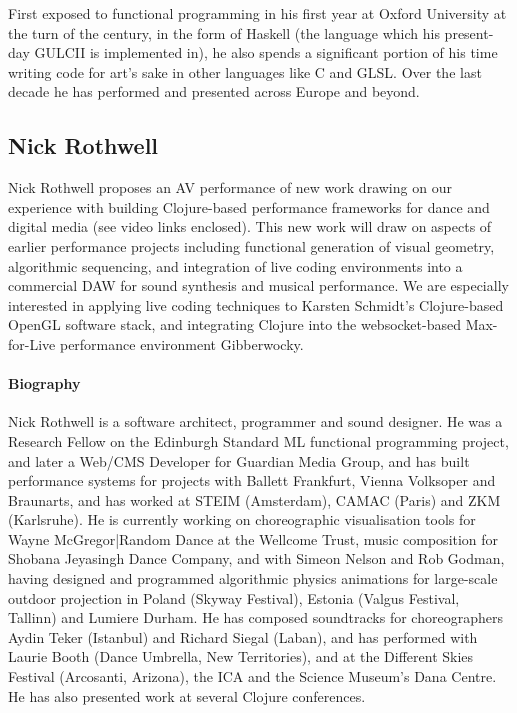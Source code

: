 \documentclass[sigplan,10pt]{acmart}\settopmatter{}
\begin{document}
First exposed to functional programming in his first year at Oxford University
at the turn of the century, in the form of Haskell (the language which his
present-day GULCII is implemented in), he also spends a significant portion of
his time writing code for art's sake in other languages like C and GLSL.  Over
the last decade he has performed and presented across Europe and beyond.

\subsection{Nick Rothwell}

Nick Rothwell proposes an AV performance of new work drawing on our experience
with building Clojure-based performance frameworks for dance and
digital media (see video links enclosed). This new work will draw on
aspects of earlier performance projects including functional
generation of visual geometry, algorithmic sequencing, and integration
of live coding environments into a commercial DAW for sound synthesis
and musical performance. We are especially interested in applying live
coding techniques to Karsten Schmidt's Clojure-based OpenGL software
stack, and integrating Clojure into the websocket-based Max-for-Live
performance environment Gibberwocky.


\paragraph{Biography} Nick Rothwell is a software architect, programmer and sound
designer. He was a Research Fellow on the Edinburgh Standard ML
functional programming project, and later a Web/CMS Developer for
Guardian Media Group, and has built performance systems for projects
with Ballett Frankfurt, Vienna Volksoper and Braunarts, and has worked
at STEIM (Amsterdam), CAMAC (Paris) and ZKM (Karlsruhe).  He is
currently working on choreographic visualisation tools for Wayne
McGregor|Random Dance at the Wellcome Trust, music composition for
Shobana Jeyasingh Dance Company, and with Simeon Nelson and Rob
Godman, having designed and programmed algorithmic physics animations
for large-scale outdoor projection in Poland (Skyway Festival),
Estonia (Valgus Festival, Tallinn) and Lumiere Durham.  He has
composed soundtracks for choreographers Aydin Teker (Istanbul) and
Richard Siegal (Laban), and has performed with Laurie Booth (Dance
Umbrella, New Territories), and at the Different Skies Festival
(Arcosanti, Arizona), the ICA and the Science Museum’s Dana Centre. He
has also presented work at several Clojure conferences.
\end{document}

